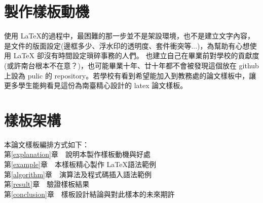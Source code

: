 \newpage

\section{製作樣板動機}\label{1-2}
使用 \LaTeX 的過程中，最困難的那一步並不是架設環境，也不是建立文字內容，是文件的版面設定(邊框多少、浮水印的透明度、套件衝突等...)，為幫助有心想使用 LaTeX 卻沒有時間設定瑣碎事務的人們。
也建立自己在畢業前對學校的貢獻度(或許南台根本不在意？)，也可能畢業十年、廿十年都不會被發現這個放在 github 上設為 pulic 的 repository。若學校有看到希望能加入到教務處的論文樣板中，讓更多學生能夠看見這份為南臺精心設計的 latex 論文樣板。

\section{樣板架構}\label{1-3}
\n 本論文樣板編排方式如下：\\
第\ref{explanation}章　說明本製作樣板動機與好處\\
第\ref{example}章　本樣板精心製作 \LaTeX 語法範例\\
第\ref{algorithm}章　演算法及程式碼插入語法範例\\
第\ref{result}章　驗證樣板結果\\
第\ref{conclusion}章　樣板設計結論與對此樣本的未來期許
